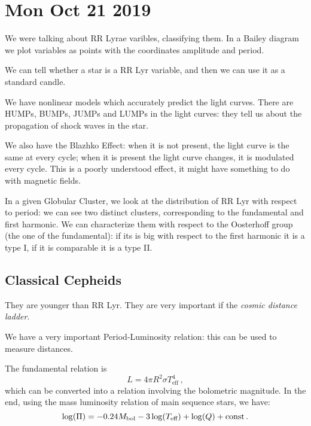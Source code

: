 \documentclass[main.tex]{subfiles}
\begin{document}
\section*{Mon Oct 21 2019}

We were talking about RR Lyrae varibles, classifying them.
In a Bailey diagram we plot variables as points with the coordinates amplitude and period.

We can tell whether a star is a RR Lyr variable, and then we can use it as a standard candle.

We have nonlinear models which accurately predict the light curves.
There are HUMPs, BUMPs, JUMPs and LUMPs in the light curves:
they tell us about the propagation of shock waves in the star.

We also have the Blazhko Effect: when it is not present, the light curve is the same at every cycle; when it is present the light curve changes, it is modulated every cycle.
This is a poorly understood effect, it might have something to do with magnetic fields.

In a given Globular Cluster, we look at the distribution of RR Lyr with respect to period: we can see two distinct clusters, corresponding to the fundamental and first harmonic.
We can characterize them with respect to the Oosterhoff group (the one of the fundamental): if its is big with respect to the first harmonic it is a type I, if it is comparable it is a type II.

\subsection{Classical Cepheids}

They are younger than RR Lyr.
They are very important if the \emph{cosmic distance ladder}.

We have a very important Period-Luminosity relation: this can be used to measure distances.


The fundamental relation is 
%
\begin{equation}
  L = 4 \pi R^2 \sigma T^4 _{\text{eff}}
\,,
\end{equation}
%
which can be converted into a relation involving the bolometric magnitude.
In the end,  using the mass luminosity relation of main sequence stars, we have: 
%
\begin{equation}
  \log(\Pi ) = \num{-0.24}M _{\text{bol}} - 3 \log(T _{\text{eff}}) + \log(Q) + \text{const}
\,.
\end{equation}
%
\end{document}
